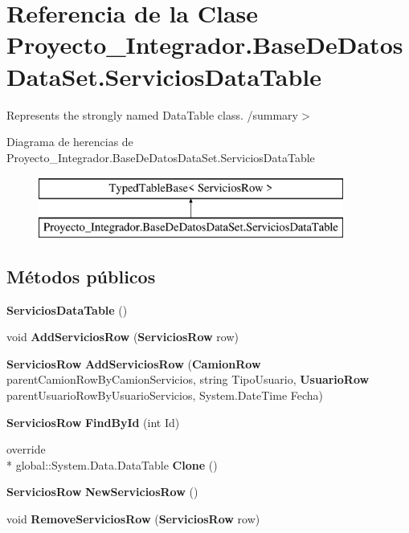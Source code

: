 \section{Referencia de la Clase Proyecto\-\_\-\-Integrador.\-Base\-De\-Datos\-Data\-Set.\-Servicios\-Data\-Table}
\label{class_proyecto___integrador_1_1_base_de_datos_data_set_1_1_servicios_data_table}


Represents the strongly named Data\-Table class. /summary$>$  


Diagrama de herencias de Proyecto\-\_\-\-Integrador.\-Base\-De\-Datos\-Data\-Set.\-Servicios\-Data\-Table\begin{figure}[H]
\begin{center}
\leavevmode
\includegraphics[height=2.000000cm]{class_proyecto___integrador_1_1_base_de_datos_data_set_1_1_servicios_data_table}
\end{center}
\end{figure}
\subsection*{Métodos públicos}
\begin{DoxyCompactItemize}
\item 
{\bf Servicios\-Data\-Table} ()
\item 
void {\bf Add\-Servicios\-Row} ({\bf Servicios\-Row} row)
\item 
{\bf Servicios\-Row} {\bf Add\-Servicios\-Row} ({\bf Camion\-Row} parent\-Camion\-Row\-By\-Camion\-Servicios, string Tipo\-Usuario, {\bf Usuario\-Row} parent\-Usuario\-Row\-By\-Usuario\-Servicios, System.\-Date\-Time Fecha)
\item 
{\bf Servicios\-Row} {\bf Find\-By\-Id} (int Id)
\item 
override \\*
global\-::\-System.\-Data.\-Data\-Table {\bf Clone} ()
\item 
{\bf Servicios\-Row} {\bf New\-Servicios\-Row} ()
\item 
void {\bf Remove\-Servicios\-Row} ({\bf Servicios\-Row} row)
\end{DoxyCompactItemize}
